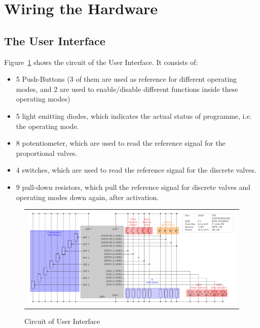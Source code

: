 \documentclass[
	fontsize=10pt
	paper=a4
]{scrartcl}
\begin{document}
\section{Wiring the Hardware}

\subsection{The User Interface}

Figure~\ref{fig:hui_circuit} shows the circuit of the User Interface. 
It consists of:
\begin{itemize}
	\item 5 Push-Buttons (3 of them are used as reference for different operating modes, and 2 are used to enable/disable different functions inside these operating modes)
	\item 5 light emitting diodes, which indicates the actual status of programme, i.e. the operating mode.
	\item 8 potentiometer, which are used to read the reference signal for the proportional valves.
	\item 4 switches, which are used to read the reference signal for the discrete valves.
	\item 9 pull-down resistors, which pull the reference signal for discrete valves and operating modes down again, after activation.
\end{itemize}

\begin{figure}
\begin{center}
\begin{tabular}{c}
\includegraphics[width=.98\textwidth]{Images/circuit_HUI/circuit_HUI.pdf} \\
\end{tabular}
\end{center}
\caption{Circuit of User Interface}
\label{fig:hui_circuit}
\end{figure}
\end{document}
